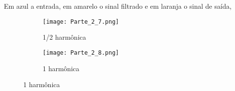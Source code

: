 \documentclass{article}
\begin{document}
        Em azul a entrada, em amarelo o sinal filtrado e em laranja o sinal de saída,
        \begin{figure}[H]
            \begin{multicols}{2}
                \begin{figure}[H]
                    \begin{center}
                        \texttt{[image: Parte\_2\_7.png]}
                        \caption{1/2 harmônica}
                        \label{fig:Parte_2_7}
                    \end{center}
                \end{figure}
                \begin{figure}[H]
                    \begin{center}
                        \texttt{[image: Parte\_2\_8.png]}
                        \caption{1 harmônica}
                        \label{fig:Parte_2_8}
                    \end{center}
                \end{figure}
            \end{multicols}
        \end{figure}
\end{document}
